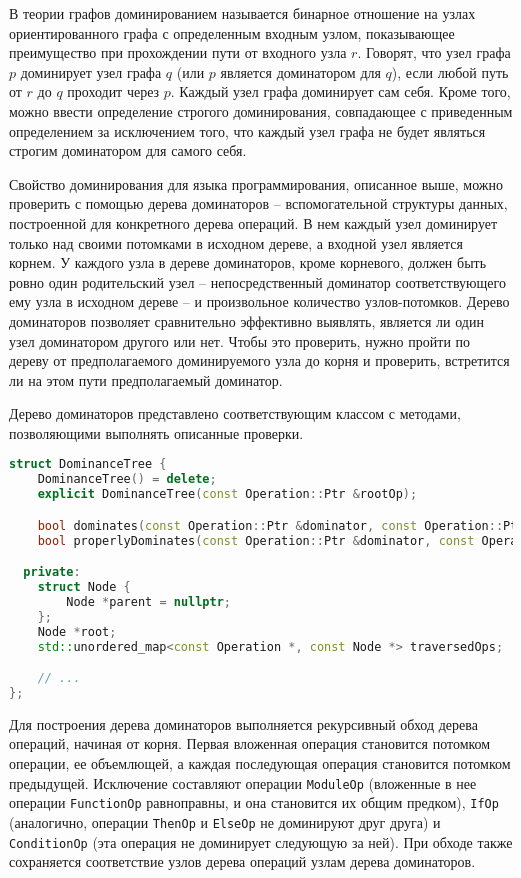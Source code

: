 В теории графов доминированием называется бинарное отношение на узлах ориентированного графа с определенным входным узлом, показывающее преимущество при прохождении пути от входного узла \(r\).
Говорят, что узел графа \(p\) доминирует узел графа \(q\) (или \(p\) является доминатором для \(q\)), если любой путь от \(r\) до \(q\) проходит через \(p\).
Каждый узел графа доминирует сам себя.
Кроме того, можно ввести определение строгого доминирования, совпадающее с приведенным определением за исключением того, что каждый узел графа не будет являться строгим доминатором для самого себя.

Свойство доминирования для языка программирования, описанное выше, можно проверить с помощью дерева доминаторов -- вспомогательной структуры данных, построенной для конкретного дерева операций.
В нем каждый узел доминирует только над своими потомками в исходном дереве, а входной узел является корнем.
У каждого узла в дереве доминаторов, кроме корневого, должен быть ровно один родительский узел -- непосредственный доминатор соответствующего ему узла в исходном дереве -- и произвольное количество узлов-потомков.
Дерево доминаторов позволяет сравнительно эффективно выявлять, является ли один узел доминатором другого или нет.
Чтобы это проверить, нужно пройти по дереву от предполагаемого доминируемого узла до корня и проверить, встретится ли на этом пути предполагаемый доминатор.
\cite{habr_dominance}

Дерево доминаторов представлено соответствующим классом с методами, позволяющими выполнять описанные проверки.

\begin{lstlisting}[language=C++, caption=Объявление класса DominanceTree]
struct DominanceTree {
    DominanceTree() = delete;
    explicit DominanceTree(const Operation::Ptr &rootOp);

    bool dominates(const Operation::Ptr &dominator, const Operation::Ptr &dominated) const;
    bool properlyDominates(const Operation::Ptr &dominator, const Operation::Ptr &dominated) const;

  private:
    struct Node {
        Node *parent = nullptr;
    };
    Node *root;
    std::unordered_map<const Operation *, const Node *> traversedOps;

    // ...
};
\end{lstlisting}

Для построения дерева доминаторов выполняется рекурсивный обход дерева операций, начиная от корня.
Первая вложенная операция становится потомком операции, ее объемлющей, а каждая последующая операция становится потомком предыдущей.
Исключение составляют операции \verb|ModuleOp| (вложенные в нее операции \verb|FunctionOp| равноправны, и она становится их общим предком), \verb|IfOp| (аналогично, операции \verb|ThenOp| и \verb|ElseOp| не доминируют друг друга) и \verb|ConditionOp| (эта операция не доминирует следующую за ней).
При обходе также сохраняется соответствие узлов дерева операций узлам дерева доминаторов.

